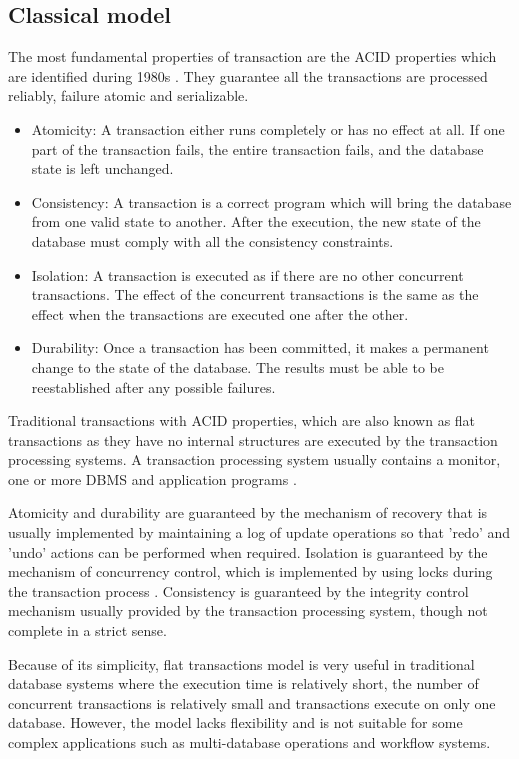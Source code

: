 \documentclass{sig-alternate-05-2015}
\begin{document}
\subsection{Classical model}

The most fundamental properties of transaction are the ACID properties which are identified during 1980s \cite{gray1981transaction, haerder1983principles}. They guarantee all the transactions are processed reliably, failure atomic and serializable.

\begin{itemize}
    \item Atomicity: A transaction either runs completely or has no effect at all. If one part of the transaction fails, the entire transaction fails, and the database state is left unchanged.
    \item Consistency: A transaction is a correct program which will bring the database from one valid state to another. After the execution, the new state of the database must comply with all the consistency constraints.
    \item Isolation: A transaction is executed as if there are no other concurrent transactions. The effect of the concurrent transactions is the same as the effect when the transactions are executed one after the other.
    \item Durability: Once a transaction has been committed, it makes a permanent change to the state of the database. The results must be able to be reestablished after any possible failures.
\end{itemize}

Traditional transactions with ACID properties, which are also known as flat transactions as they have no internal structures are executed by the transaction processing systems. A transaction processing system usually contains a monitor, one or more DBMS and application programs \cite{lewis2002databases}.

Atomicity and durability are guaranteed by the mechanism of recovery that is usually implemented by maintaining a log of update operations so that 'redo' and 'undo' actions can be performed when required. Isolation is guaranteed by the mechanism of concurrency control, which is implemented by using locks during the transaction process \cite{chrysanthis1996advances}. Consistency is guaranteed by the integrity control mechanism usually provided by the transaction processing system, though not complete in a strict sense.

Because of its simplicity, flat transactions model is very useful in traditional database systems where the execution time is relatively short, the number of concurrent transactions is relatively small and transactions execute on only one database. However, the model lacks flexibility and is not suitable for some complex applications such as multi-database operations and workflow systems.
\end{document}
